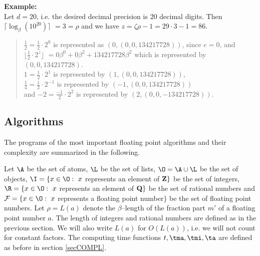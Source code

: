 {\bf Example:} \\  
Let $d = 20$, i.e. the desired decimal precision is $20$
decimal digits. Then  
$\lceil \log_{\beta}(10^{20}) \rceil$ $= 3 = \rho$ 
and we have $z = \zeta \rho - 1 = 29 \cdot 3 - 1 = 86$.
\begin{quote}
    $\frac{1}{2} = \frac{1}{2} \cdot 2^0$ is 
    represented as $(0,(0,0,134217728))$, 
    since $e = 0$, and $\lfloor \frac{1}{2} \cdot 2^z \rfloor$ 
    $= 0 \beta^0 + 0 \beta^2 + 134217728 \beta^2$
    which is represented by $(0,0,134217728)$.
    \\
    $1 = \frac{1}{2} \cdot 2^1$ is represented 
         by $(1,(0,0,134217728))$, \\ 
    $\frac{1}{4} = \frac{1}{2} \cdot 2^{-1}$ is represented 
         by $(-1,(0,0,134217728))$ \\ and 
    $-2 = \frac{-1}{2} \cdot 2^2$ is represented 
         by $(2,(0,0,-134217728))$. 
\end{quote}


\subsection{Algorithms}

The programs of the most important floating point algorithms 
and their complexity are summarized in the following.

\def\F{{\cal F}}
Let
$\A$ be the set of atoms,
$\L$ be the set of lists,
$\O = \A \cup \L$ be the set of objects,
$\I = \{ x \in \O: \ x$ represents an element of ${\rm \bf Z} \}$ 
be the set of integers, 
$\R = \{ x \in \O: \ x$ represents an element of ${\rm \bf Q} \}$ 
be the set of rational numbers and 
$\F = \{ x \in \O: \ x$ represents a floating point number$\}$ 
be the set of floating point numbers. 
Let $\rho = L(a)$ denote the $\beta$--length 
of the fraction part $m'$ of a floating point number $a$.
The length of integers and rational numbers are defined as in
the previous section.
We will also write $L(a)$ for $O(L(a))$, i.e. we will not count for 
constant factors.
The computing time functions $t, \tma, \tmi, \ta$ 
are defined as before in section \ref{secCOMPL}.


